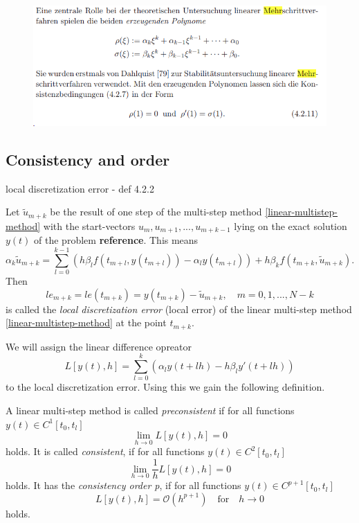 \begin{figure}[H]
	\centering
	\includegraphics[width=0.7\linewidth]{screenshot013}
	\caption{}
	\label{fig:screenshot013}
\end{figure}


\subsection{Consistency and order}
local discretization error - def 4.2.2
\begin{definition}
	Let $\tilde{u}_{m+k}$ be the result of one step of the multi-step method \ref{linear-multistep-method} with the start-vectors $u_m, u_{m+1}, ..., u_{m+k-1}$ lying on the exact solution $y(t)$ of the problem \textbf{reference}. This means
	\begin{displaymath}
		\alpha_k \tilde{u}_{m+k} = \sum_{l=0}^{k-1} \left( h \beta_l f(t_{m+l}, y(t_{m+l})) - \alpha_l y(t_{m+l}) \right) + h \beta_k f(t_{m+k}, \tilde{u}_{m+k}) .
	\end{displaymath}
	Then
	\begin{displaymath}
		le_{m+k} = le(t_{m+k}) = y(t_{m+k}) - \tilde{u}_{m+k}, \quad m=0,1,...,N-k
	\end{displaymath}
	is called the \emph{local discretization error} (local error) of the linear multi-step method \ref{linear-multistep-method} at the point $t_{m+k}$.
\end{definition}

We will assign the linear difference opreator
\begin{equation}
	L[y(t),h] = \sum_{l=0}^{k} \left( \alpha_l y(t+lh) - h \beta_l y'(t+lh) \right)
\end{equation}
to the local discretization error. Using this we gain the following definition.

\begin{definition}
	A linear multi-step method is called \emph{preconsistent} if for all functions $y(t) \in C^1[t_0,t_l]$
	\begin{displaymath}
		\lim\limits_{h \to 0} L[y(t),h]=0
	\end{displaymath}
	holds. It is called \emph{consistent}, if for all functions $y(t) \in C^2[t_0,t_l]$
	\begin{displaymath}
		\lim\limits_{h \to 0} \frac{1}{h} L[y(t),h] = 0
	\end{displaymath}
	holds. It has the \emph{consistency order p}, if for all functions $y(t) \in C^{p+1}[t_0, t_l]$
	\begin{displaymath}
		L[y(t),h] = \mathcal{O}(h^{p+1}) \quad \text{for} \quad h \to 0
	\end{displaymath}
	holds.
\end{definition}

